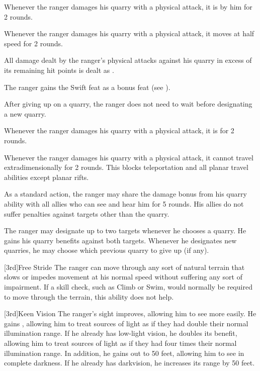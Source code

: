         Whenever the ranger damages his quarry with a physical attack, it is \goaded by him for 2 rounds.

        Whenever the ranger damages his quarry with a physical attack, it moves at half speed for 2 rounds.

        All damage dealt by the ranger's physical attacks against his quarry in excess of its remaining hit points is dealt as .

        The ranger gains the Swift feat as a bonus feat (see ).

        After giving up on a quarry, the ranger does not need to wait before designating a new quarry.

        Whenever the ranger damages his quarry with a physical attack, it is \impaired for 2 rounds.

        Whenever the ranger damages his quarry with a physical attack, it cannot travel extradimensionally for 2 rounds.
        This blocks teleportation and all planar travel abilities except planar rifts.

        As a standard action, the ranger may share the damage bonus from his quarry ability with all allies who can see and hear him for 5 rounds.
        His allies do not suffer penalties against targets other than the quarry.

        The ranger may designate up to two targets whenever he chooses a quarry.
        He gains his quarry benefits against both targets.
        Whenever he designates new quarries, he may choose which previous quarry to give up (if any).

        [3rd]{Free Stride}
        The ranger can move through any sort of natural terrain that slows or impedes movement at his normal speed without suffering any sort of impairment.
        If a skill check, such as Climb or Swim, would normally be required to move through the terrain, this ability does not help.

        [3rd]{Keen Vision}
        The ranger's sight improves, allowing him to see more easily.
        He gains , allowing him to treat sources of light as if they had double their normal illumination range.
        If he already has low-light vision, he doubles its benefit, allowing him to treat sources of light as if they had four times their normal illumination range.
        In addition, he gains  out to 50 feet, allowing him to see in complete darkness.
        If he already has darkvision, he increases its range by 50 feet.

